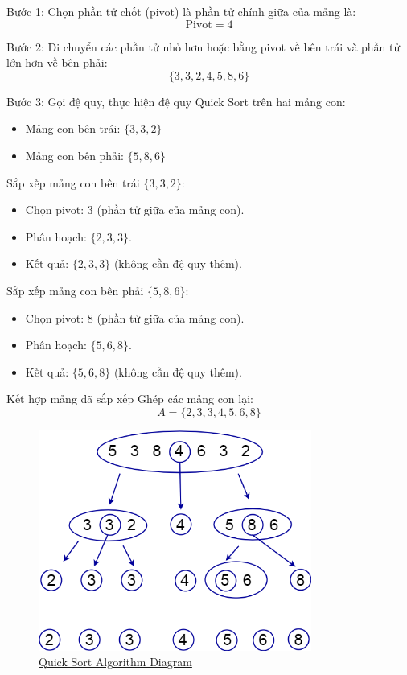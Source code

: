 Bước 1: Chọn phần tử chốt (pivot) là phần tử chính giữa của mảng là:
\[
\text{Pivot} = 4
\]

Bước 2: Di chuyển các phần tử nhỏ hơn hoặc bằng pivot về bên trái và phần tử lớn hơn về bên phải:
\[
\{3, 3, 2, 4, 5, 8, 6\}
\]

Bước 3: Gọi đệ quy, thực hiện đệ quy Quick Sort trên hai mảng con:
\begin{itemize}
    \item Mảng con bên trái: \(\{3, 3, 2\}\)
    \item Mảng con bên phải: \(\{5, 8, 6\}\)
\end{itemize}

Sắp xếp mảng con bên trái \(\{3, 3, 2\}\):
\begin{itemize}
    \item Chọn pivot: \(3\) (phần tử giữa của mảng con).
    \item Phân hoạch: \(\{2, 3, 3\}\).
    \item Kết quả: \(\{2, 3, 3\}\) (không cần đệ quy thêm).
\end{itemize}

Sắp xếp mảng con bên phải \(\{5, 8, 6\}\):
\begin{itemize}
    \item Chọn pivot: \(8\) (phần tử giữa của mảng con).
    \item Phân hoạch: \(\{5, 6, 8\}\).
    \item Kết quả: \(\{5, 6, 8\}\) (không cần đệ quy thêm).
\end{itemize}

Kết hợp mảng đã sắp xếp
Ghép các mảng con lại:
\[
A = \{2, 3, 3, 4, 5, 6, 8\}
\]

\begin{figure}[H]
    \centering
    \includegraphics[width=0.8\textwidth]{img/quick_sort.png}
    \caption{\href{https://qnaplus.com/wp-content/uploads/2017/05/quick_sort.png}{Quick Sort Algorithm Diagram}}
\end{figure}

